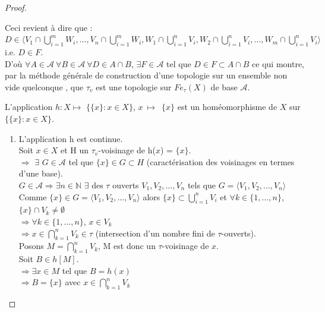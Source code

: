 \documentclass[11pt]{report}
\theoremstyle{styletheorem}
\theoremstyle{styledef}
\theoremstyle{remark}
\begin{document}
\begin{proof}
\begin{enumerate}
\begin{itemize}
			Ceci revient à dire que : \\ $D \in  \langle V_1 \cap \bigcup_{i=1}^{m} W_i, \dots, V_n \cap \bigcup_{i=1}^{m} W_i, W_1 \cap \bigcup_{i=1}^{n} V_i, W_2 \cap \bigcup_{i=1}^{n} V_i, \dots, W_{m} \cap \bigcup_{i=1}^{n} V_{i}\rangle$ i.e. $D \in F$.\\
			D'où $  \forall A \in \mathcal{A}\ \forall B \in \mathcal{A} \ \forall D \in A \cap B $, $ \exists F \in \mathcal{A} $ tel que $ D \in F \subset A \cap B $ ce qui montre, par la méthode générale de construction d'une topologie sur un ensemble non vide quelconque \cite{b9}, que $ \tau_{v} $ est une topologie sur $ Fe_{\tau}(X)  $ de base $ \mathcal{A} $.
		\end{itemize}
	\end{enumerate}
	L'application $ h : X \longmapsto $ $ \{\{x\} : x \in X \} $, $ x ~\mapsto $~$ \{x\}$ est un homéomorphisme de $X$ sur $ \lbrace \lbrace x \rbrace : x \in X \rbrace$.
	\begin{enumerate}
		\item L'application h est continue.\\
		Soit $ x \in X $ et H un $\tau_{v}$-voisinage de h($ x $) = $ \lbrace x \rbrace$.\\ $\Rightarrow$ $ \exists$ $ G \in \mathcal{A}$ tel que $ \lbrace x \rbrace \in G \subset H$ (caractérisation des voisinages en termes d'une base).\\
		$ G \in \mathcal{A} \Rightarrow \exists n \in \mathbb{N}$ $\exists$ des $\tau$ ouverts $V_1,V_2, \dots , V_n$ tels que $ G = \langle V_1,V_2, \dots , V_n\rangle$\\ Comme $\lbrace x \rbrace \in G = \langle V_1,V_2, \dots , V_n\rangle $  alors $ \lbrace x \rbrace \subset \bigcup_{i=1}^{n} V_{i}$ et $ \forall k \in \lbrace 1, \dots, n \rbrace $, $\lbrace x \rbrace \cap V_{k} \neq \emptyset$\\
		$\Rightarrow \forall k \in \lbrace 1, \dots, n \rbrace$, $ x \in V_k$ \\ 
		$\Rightarrow x \in \bigcap_{k=1}^{n} V_k \in \tau$ (intersection d'un nombre fini de $\tau$-ouverts).\\
		Posons $ M =  \bigcap_{k=1}^{n} V_k $, M est donc un $\tau$-voisinage de $x$.\\
		Soit $ B \in h[M]$.\\
		$ \Rightarrow \exists x \in M$ tel que $ B = h(x) $\\
		$\Rightarrow B = \lbrace x \rbrace $ avec $ x \in \bigcap_{k=1}^{n} V_k $\\

\end{enumerate}
\end{proof}
\end{document}
